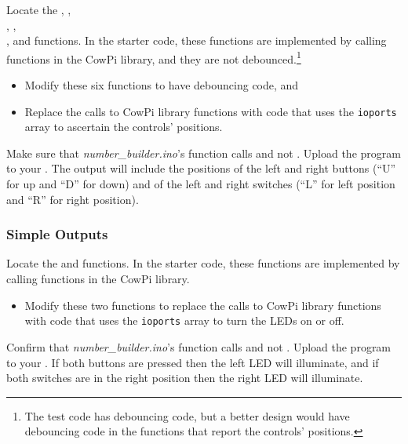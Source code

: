 Locate the , , \\ , , \\ , and   functions.
In the starter code, these functions are implemented by calling functions in the CowPi library, and they are not debounced.\footnote{
The test code has debouncing code, but a better design would have debouncing code in the functions that report the controls' positions.}

\begin{itemize}
    \item Modify these six functions to have debouncing code, and
    \item Replace the calls to CowPi library functions with code that uses the \lstinline{ioports} array to ascertain the controls' positions.
\end{itemize}

Make sure that \textit{number\_builder.ino}'s  function calls  and not .
Upload the program to your \developmentboard.
The output will include the positions of the left and right buttons (``U'' for up and ``D'' for down) and of the left and right switches (``L'' for left position and ``R'' for right position).

\subsubsection{Simple Outputs}

Locate the  and  functions.
In the starter code, these functions are implemented by calling functions in the CowPi library.

\begin{itemize}
    \item Modify these two functions to replace the calls to CowPi library functions with code that uses the \lstinline{ioports} array to turn the LEDs on or off.
\end{itemize}

Confirm that \textit{number\_builder.ino}'s  function calls  and not .
Upload the program to your \developmentboard.
If both buttons are pressed then the left LED will illuminate, and if both switches are in the right position then the right LED will illuminate.

